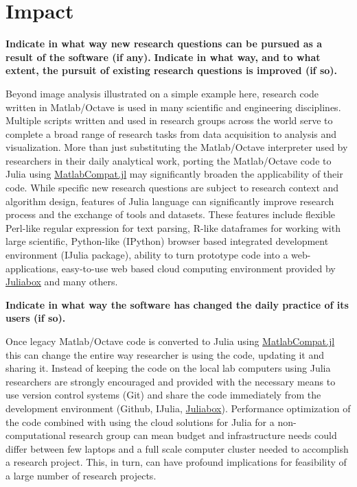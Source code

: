 \section{Impact}

\textbf{Indicate in what way new research questions can be pursued as a result of the software (if any).}
\textbf{Indicate in what way, and to what extent, the pursuit of existing research questions is improved (if so).}

Beyond image analysis illustrated on a simple example here, research code written in Matlab/Octave is used in many scientific and engineering disciplines. Multiple scripts written and used in research groups across the world serve to complete a broad range of research tasks from data acquisition to analysis and visualization. More than just substituting the Matlab/Octave interpreter used by researchers in their daily analytical work, porting the Matlab/Octave code to Julia using \href{https://github.com/MatlabCompat/MatlabCompat.jl}{MatlabCompat.jl} may significantly broaden the applicability of their code. While specific new research questions are subject to research context and algorithm design, features of Julia language can significantly improve research process and the exchange of tools and datasets. These features include flexible Perl-like regular expression for text parsing, R-like dataframes for working with large scientific, Python-like (IPython) browser based integrated development environment (IJulia package), ability to turn prototype code into a web-applications, easy-to-use web based cloud computing environment provided by \href{https://www.juliabox.org/}{Juliabox} and many others.

\textbf{Indicate in what way the software has changed the daily practice of its users (if so).}

Once legacy Matlab/Octave code is converted to Julia using \href{https://github.com/MatlabCompat/MatlabCompat.jl}{MatlabCompat.jl} this can change the entire way researcher is using the code, updating it and sharing it. Instead of keeping the code on the local lab computers using Julia researchers are strongly encouraged and provided with the necessary means to use version control systems (Git) and share the code immediately from the development environment (Github, IJulia, \href{https://www.juliabox.org/}{Juliabox}). Performance optimization of the code combined with using the cloud solutions for Julia for a non-computational research group can mean budget and infrastructure needs could differ between few laptops and a full scale computer cluster needed to accomplish a research project. This, in turn, can have profound implications for feasibility of a large number of research projects.

